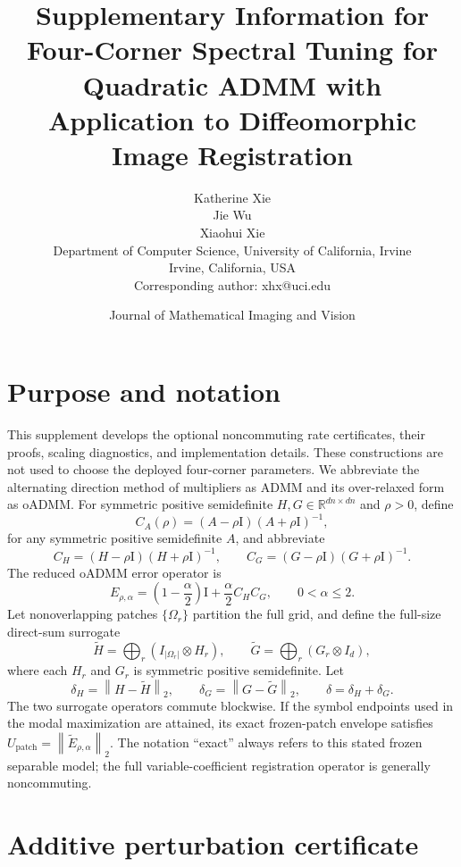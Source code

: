 \documentclass[11pt]{article}
\title{Supplementary Information for\\ Four-Corner Spectral Tuning for Quadratic ADMM with Application to Diffeomorphic Image Registration}
\author{Katherine Xie\\ Jie Wu\\ Xiaohui Xie\\Department of Computer Science, University of California, Irvine\\Irvine, California, USA\\ Corresponding author: xhx@uci.edu}
\date{Journal of Mathematical Imaging and Vision}
\newcommand{\R}{\mathbb{R}}
\newcommand{\norm}[1]{\left\lVert #1\right\rVert}
\newcommand{\Id}{\mathrm{I}}
\newcommand{\Ulfa}{U_{\mathrm{patch}}}
\begin{document}
\maketitle

\section{Purpose and notation}
This supplement develops the optional noncommuting rate certificates, their
proofs, scaling diagnostics, and implementation details. These constructions
are not used to choose the deployed four-corner parameters. We abbreviate the
alternating direction method of multipliers as ADMM and its over-relaxed form
as oADMM. For symmetric
positive semidefinite $H,G\in\R^{dn\times dn}$ and $\rho>0$, define
\[
C_A(\rho)=(A-\rho\Id)(A+\rho\Id)^{-1},
\]
for any symmetric positive semidefinite $A$, and abbreviate
\[
C_H=(H-\rho\Id)(H+\rho\Id)^{-1},\qquad
C_G=(G-\rho\Id)(G+\rho\Id)^{-1}.
\]
The reduced oADMM error operator is
\begin{equation}
E_{\rho,\alpha}=
\left(1-\frac{\alpha}{2}\right)\Id+\frac{\alpha}{2}C_HC_G,
\qquad 0<\alpha\le2.
\label{eq:E}
\end{equation}
Let nonoverlapping patches $\{\Omega_r\}$ partition the full grid, and define
the full-size direct-sum surrogate
\[
\widetilde H=\bigoplus_r(I_{|\Omega_r|}\otimes H_r),\qquad
\widetilde G=\bigoplus_r(G_r\otimes I_d),
\]
where each $H_r$ and $G_r$ is symmetric positive semidefinite. Let
\[
\delta_H=\norm{H-\widetilde H}_2,\qquad
\delta_G=\norm{G-\widetilde G}_2,\qquad
\delta=\delta_H+\delta_G.
\]
The two surrogate operators commute blockwise. If the symbol endpoints used in
the modal maximization are attained, its exact frozen-patch envelope satisfies
$\Ulfa=\norm{\widetilde E_{\rho,\alpha}}_2$. The notation ``exact'' always
refers to this stated frozen separable model; the full variable-coefficient
registration operator is generally noncommuting.

\section{Additive perturbation certificate}\label{sec:additive}
\end{document}
